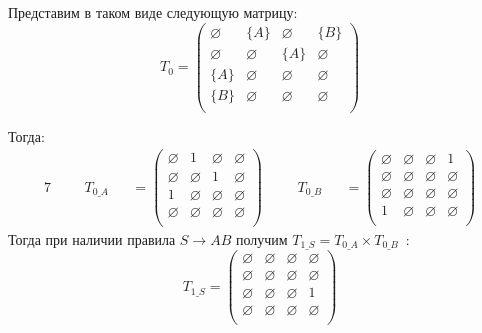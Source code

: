 \begin{example}
Представим в таком виде следующую матрицу:
\[
T_0 = \begin{pmatrix}
\varnothing & \{A\}       & \varnothing & \{B\}       \\
\varnothing & \varnothing & \{A\}       & \varnothing \\
\{A\}       & \varnothing & \varnothing & \varnothing \\
\{B\}       & \varnothing & \varnothing & \varnothing \\
\end{pmatrix}
\]

Тогда:
\begin{alignat*}{7}
& &&T_{0\_A} &&= \begin{pmatrix}
\varnothing & 1       & \varnothing & \varnothing       \\
\varnothing & \varnothing & 1       & \varnothing \\
1  & \varnothing & \varnothing & \varnothing       \\
\varnothing       & \varnothing & \varnothing & \varnothing \\
\end{pmatrix} \ \ \ \ &&T_{0\_B} &&= \begin{pmatrix}
\varnothing & \varnothing       & \varnothing & 1       \\
\varnothing       & \varnothing & \varnothing       & \varnothing \\
\varnothing  & \varnothing & \varnothing & \varnothing       \\
1       & \varnothing & \varnothing & \varnothing \\
\end{pmatrix}
\end{alignat*}
Тогда при наличии правила $S \to A B$ получим $T_{1\_S} =T_{0\_A} \times T_{0\_B}$~:
\[
T_{1\_S} = \begin{pmatrix}
\varnothing & \varnothing       & \varnothing & \varnothing       \\
\varnothing       & \varnothing & \varnothing       & \varnothing \\
\varnothing  & \varnothing & \varnothing & 1       \\
\varnothing       & \varnothing & \varnothing & \varnothing \\
\end{pmatrix}
\]
\end{example}

\medskip

